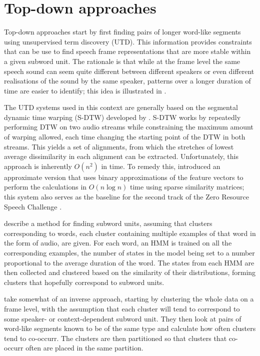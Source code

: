 \section{Top-down approaches}

Top-down approaches start by first finding pairs of longer word-like segments using unsupervised term discovery (UTD).
This information provides constraints that can be use to find speech frame representations that are more stable within a given subword unit.
The rationale is that while at the frame level the same speech sound can seem quite different between different speakers or even different realisations of the sound by the same speaker, patterns over a longer duration of time are easier to identify; this idea is illustrated in \textcite{jansen2013weak}.

The UTD systems used in this context are generally based on the segmental dynamic time warping (S-DTW) developed by \textcite{park2008unsupervised}.
S-DTW works by repeatedly performing DTW on two audio streams while constraining the maximum amount of warping allowed, each time changing the starting point of the DTW in both streams.
This yields a set of alignments, from which the stretches of lowest average dissimilarity in each alignment can be extracted.
Unfortunately, this approach is inherently $O(n^2)$ in time.
To remedy this, \textcite{jansen2011efficient} introduced an approximate version that uses binary approximations of the feature vectors to perform the calculations in $O(n \log n)$ time using sparse similarity matrices; this system also serves as the baseline for the second track of the Zero Resource Speech Challenge \parencite{versteegh2015zero}.

\textcite{jansen2011towards} describe a method for finding subword units, assuming that clusters corresponding to words, each cluster containing multiple examples of that word in the form of audio, are given.
For each word, an HMM is trained on all the corresponding examples, the number of states in the model being set to a number proportional to the average duration of the word.
The states from each HMM are then collected and clustered based on the similarity of their distributions, forming clusters that hopefully correspond to subword units.

\textcite{jansen2013weak} take somewhat of an inverse approach, starting by clustering the whole data on a frame level, with the assumption that each cluster will tend to correspond to some speaker- or context-dependent subword unit.
They then look at pairs of word-like segments known to be of the same type and calculate how often clusters tend to co-occurr.
The clusters are then partitioned so that clusters that co-occurr often are placed in the same partition.

